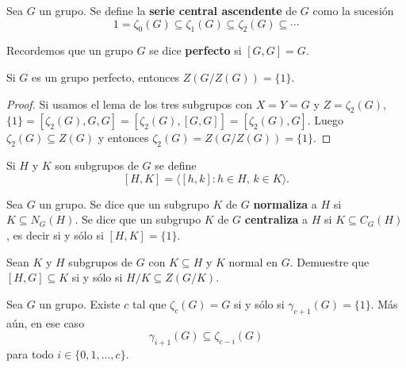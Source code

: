 \begin{definition}
	Sea $G$ un grupo. Se define la \textbf{serie central ascendente} de $G$
	como la sucesión
	\[
		1=\zeta_0(G)\subseteq\zeta_1(G)\subseteq\zeta_2(G)\subseteq\cdots
	\]
\end{definition}


Recordemos que un grupo $G$ se dice \textbf{perfecto} si $[G,G]=G$.

\begin{theorem}[Gr\"un]
	\label{theorem:Grun}
	Si $G$ es un grupo perfecto, entonces $Z(G/Z(G))=\{1\}$. 
\end{theorem}

\begin{proof}
	Si usamos el lema de los tres subgrupos con $X=Y=G$ y $Z=\zeta_2(G)$, 
	$\{1\}=[\zeta_2(G),G,G]=[\zeta_2(G),[G,G]]=[\zeta_2(G),G]$. Luego 	
	$\zeta_2(G)\subseteq Z(G)$ y
	entonces $\zeta_2(G)=Z(G/Z(G))=\{1\}$. 
\end{proof}




Si $H$ y $K$ son subgrupos de $G$ se define
\[
	[H,K]=\langle [h,k]:h\in H,\,k\in K\rangle.
\]

    Sea $G$ un grupo. Se dice que un subgrupo $K$ de $G$ \textbf{normaliza} a
	$H$ si $K\subseteq N_G(H)$.
	Se dice que un subgrupo $K$ de $G$ \textbf{centraliza} a
	$H$ si $K\subseteq C_G(H)$, es decir si y sólo si $[H,K]=\{1\}$.

\begin{exercise}
	Sean $K$ y $H$ subgrupos de $G$ con $K\subseteq H$ y $K$ normal en $G$.
	Demuestre que $[H,G]\subseteq K$ si y sólo si $H/K\subseteq Z(G/K)$. 
\end{exercise}
\begin{lemma}
	\label{lemma:gamma_zeta}
	Sea $G$ un grupo. Existe $c$ tal que $\zeta_c(G)=G$ si y sólo si 
	$\gamma_{c+1}(G)=\{1\}$. Más aún, en ese caso 
	\[
	\gamma_{i+1}(G)\subseteq\zeta_{c-i}(G)
	\]
	para todo $i\in\{0,1,\dots,c\}$. 
\end{lemma}

